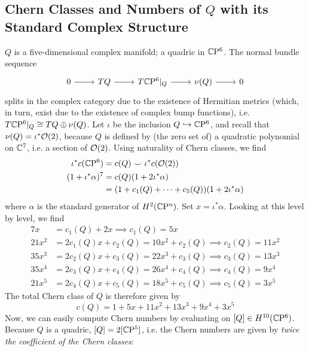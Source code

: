\documentclass{scrartcl}
\begin{document}
\subsection{Chern Classes and Numbers of \texorpdfstring{$Q$}{Q} with its Standard Complex Structure}

$Q$ is a five-dimensional complex manifold; a quadric in $\mathbb{C}\mathrm{P}^6$. The normal bundle sequence
\begin{equation*}
	\begin{tikzcd}
		0 \ar[r] & TQ \ar[r] & T\CP^6|_Q \ar[r] & \nu(Q) \ar[r] & 0
	\end{tikzcd}
\end{equation*}
splits in the complex category due to the existence of Hermitian metrics (which, in turn, exist due to the existence of complex bump functions), i.e. $T\mathbb{C}\mathrm{P}^6|_Q\cong TQ\oplus \nu(Q)$. Let $\iota$ be the inclusion $Q\hookrightarrow \mathbb{C}\mathrm{P}^6$, and recall that $\nu(Q)=\iota^*\mathcal{O}(2)$, because $Q$ is defined by (the zero set of) a quadratic polynomial on $\mathbb{C}^7$, i.e. a section of $\mathcal{O}(2)$. Using naturality of Chern classes, we find
\begin{align*}
	\iota^* c(\mathbb{C}\mathrm{P}^6)&=c(Q)\smile \iota^*c(\mathcal{O}(2))\\
	(1+\iota^*\alpha)^7&=c(Q)(1+2\iota^*\alpha)\\
	&=(1+c_1(Q)+\dots +c_5(Q))(1+2\iota^*\alpha)
\end{align*}
where $\alpha$ is the standard generator of $H^2(\mathbb{C}\mathrm{P}^n)$. Set $x=\iota^*\alpha$. Looking at this level by level, we find
\begin{align*}
	7x&=c_1(Q)+2x\implies c_1(Q)=5x\\
	21x^2&=2c_1(Q)x+c_2(Q)=10x^2+c_2(Q)
	\implies c_2(Q)=11x^2 \\
	35x^3&=2c_2(Q)x+c_3(Q)=22x^3+c_3(Q)\implies c_3(Q)=13x^3\\
	35x^4&=2c_3(Q)x+c_4(Q)=26x^4+c_4(Q)\implies c_4(Q)=9x^4\\
	21x^5&=2c_4(Q)x+c_5(Q)=18x^5+c_5(Q)\implies c_5(Q)=3x^5
\end{align*}
The total Chern class of $Q$ is therefore given by 
\begin{equation}
	c(Q)=1+5x+11x^2+13x^3+9x^4+3x^5
\end{equation}
Now, we can easily compute Chern numbers by evaluating on $[Q]\in H^{10}(\mathbb{C}\mathrm{P}^6)$. Because $Q$ is a quadric, $[Q]=2[\mathbb{C}\mathrm{P}^5]$, i.e. the Chern numbers are given by \emph{twice the coefficient of the Chern classes}:
\end{document}
